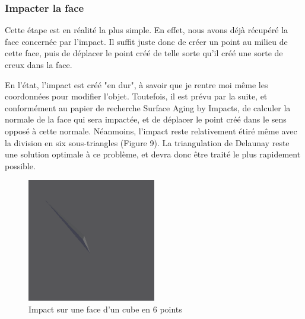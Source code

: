 \documentclass[a4paper,french]{report}
\begin{document}
				\subsubsection{Impacter la face}
					Cette étape est en réalité la plus simple. En effet, nous avons déjà récupéré la face concernée par l'impact. Il suffit juste donc de créer un point au milieu de cette face, puis de déplacer le point créé de telle sorte qu'il créé une sorte de creux dans la face. \par
					En l'état, l'impact est créé "en dur", à savoir que je rentre moi même les coordonnées pour modifier l'objet. Toutefois, il est prévu par la suite, et conformément au papier de recherche Surface Aging by Impacts, de calculer la normale de la face qui sera impactée, et de déplacer le point créé dans le sens opposé à cette normale.
					Néanmoins, l'impact reste relativement étiré même avec la division en six sous-triangles (Figure 9). La triangulation de Delaunay reste une solution optimale à ce problème, et devra donc être traité le plus rapidement possible.
					\begin{figure}[h]
						\centering
						\includegraphics[width=0.5\textwidth]{impact2.png}
						\caption{Impact sur une face d'un cube en 6 points}
					\end{figure}
\end{document}
